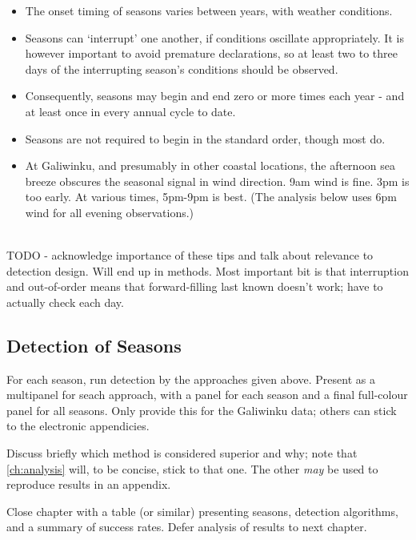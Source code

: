 \begin{itemize}
\item The onset timing of seasons varies between years, with weather conditions. 

\item Seasons can `interrupt' one another, if conditions oscillate appropriately.
        It is however important to avoid premature declarations, so at least two to
        three days of the interrupting season's conditions should be observed.

\item Consequently, seasons may begin and end zero or more times each year -
        and at least once in every annual cycle to date.

\item Seasons are not required to begin in the standard order, though most do.

\item At Galiwinku, and presumably in other coastal locations, the afternoon
        sea breeze obscures the seasonal signal in wind direction.
        9am wind is fine.  3pm is too early.  At various times, 5pm-9pm is best.
        (The analysis below uses 6pm wind for all evening observations.)
\end{itemize}

~\\

TODO - acknowledge importance of these tips and talk about relevance to
detection design.  Will end up in methods.  Most important bit is that
interruption and out-of-order means that forward-filling last known
doesn't work; have to actually check each day.




\subsection{Detection of Seasons}
For each season, run detection by the approaches given above.
Present as a multipanel for seach approach, with a panel for each season
and a final full-colour panel for all seasons.  Only provide this for the
Galiwinku data; others can stick to the electronic appendicies.

Discuss briefly which method is considered superior and why; note
that \autoref{ch:analysis} will, to be concise, stick to that one.
The other \emph{may} be used to reproduce results in an appendix.

Close chapter with a table (or similar) presenting seasons, detection
algorithms, and a summary of success rates.  Defer analysis of results
to next chapter.


